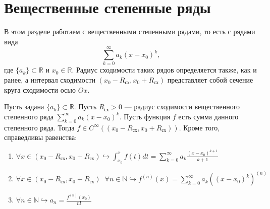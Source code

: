 \documentclass[11pt]{article}
\begin{document}
\section{Вещественные степенные ряды}
В этом разделе работаем с вещественными степенными рядами, то есть с рядами вида 
\[\displaystyle \sum_{k = 0}^{\infty} a_k (x - x_0)^k,\] 
где $\{a_k\} \subset \mathbb{R}$ и $x_0 \in \mathbb{R}$. Радиус сходимости таких рядов определяется также, как и ранее, а интервал сходимости $\left(x_0 - R_{\text{сх}}, x_0 + R_{\text{сх}}\right)$ представляет собой сечение круга сходимости осью $Ox$.

\begin{theorem}
    Пусть задана $\{a_k\} \subset \mathbb{R}$. Пусть $R_{\text{сх}} > 0$ --- радиус сходимости вещественного степенного ряда $\displaystyle \sum_{k = 0}^{\infty} a_k (x - x_0)^k$. Пусть функция $f$ есть сумма данного степенного ряда. Тогда $f \in C^{\infty} (\left(x_0 - R_{\text{сх}}, x_0 + R_{\text{сх}}\right))$. Кроме того, справедливы равенства:
    \begin{enumerate}
        \item $\displaystyle \forall x \in \left(x_0 - R_{\text{сх}}, x_0 + R_{\text{сх}}\right) \hookrightarrow \int_{x_0}^x f(t) dt = \sum_{k = 0}^{\infty} a_k \frac{(x - x_0)^{k + 1}}{k + 1}$
        \item $\displaystyle \forall x \in \left(x_0 - R_{\text{сх}}, x_0 + R_{\text{сх}}\right) \; \; \forall n \in \mathbb{N} \hookrightarrow f^{(n)} (x) = \sum_{k = 0}^{\infty} a_k \left((x - x_0)^k\right)^{(n)}$
        \item $\displaystyle \forall n \in \mathbb{N} \hookrightarrow a_n = \frac{f^{(n)} (x_0)}{n!}$
    \end{enumerate}
\end{theorem}
\end{document}
